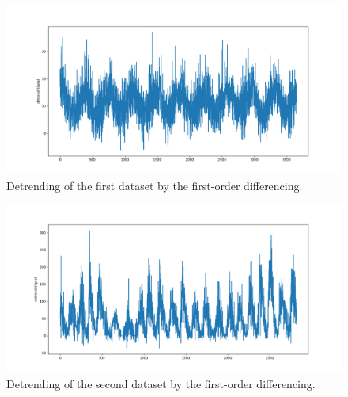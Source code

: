 \begin{figure}[H]
    \centering
    \begin{minipage}[b]{1\textwidth}
        \includegraphics[width=\textwidth]{figures/Ass1/Ass1_D1_one_diff.png}
    \end{minipage}
    \caption{Detrending of the first dataset by the first-order differencing.}
    \label{fig:Ass1_D1_one_diff}
\end{figure}

\begin{figure}[H]
    \centering
    \begin{minipage}[b]{1\textwidth}
        \includegraphics[width=\textwidth]{figures/Ass1/Ass1_D2_one_diff.png}
    \end{minipage}
    \caption{Detrending of the second dataset by the first-order differencing.}
    \label{fig:Ass1_D2_one_diff}
\end{figure}

